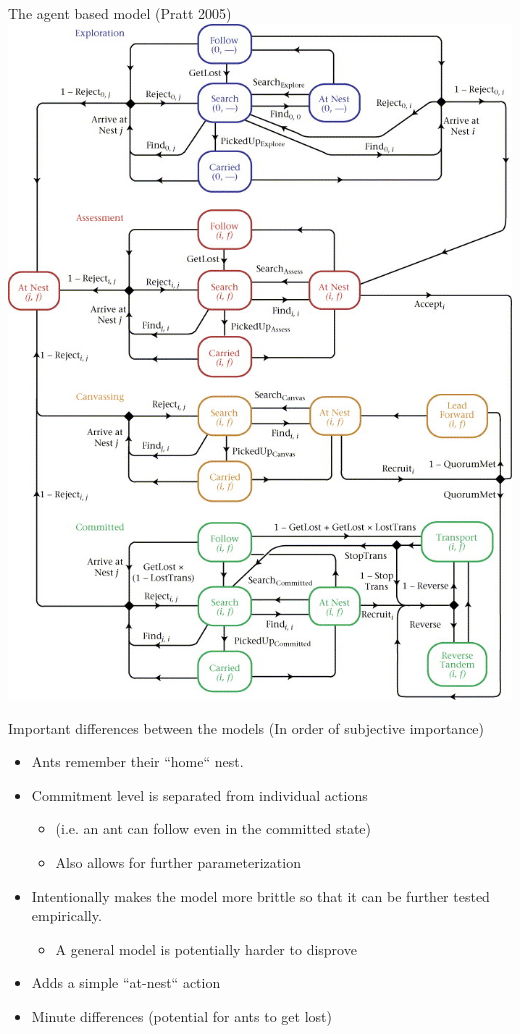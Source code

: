 \documentclass{beamer}
\newcommand{\sitem}[1]
{
    \begin{itemize}
        \item #1
    \end{itemize}
}
\begin{document}
  \begin{frame}{The agent based model (Pratt 2005)}
       \includegraphics[scale=1.6]{agent}
  \end{frame}

  \begin{frame}{Important differences between the models (In order of subjective importance)}
      \begin{itemize}
          \item Ants remember their ``home`` nest.
          \item Commitment level is separated from individual actions 
              \sitem{(i.e. an ant can follow even in the committed state)}
              \sitem{Also allows for further parameterization}
          \item Intentionally makes the model more brittle so that it can be further tested empirically. 
              \sitem{A general model is potentially harder to disprove}
          \item Adds a simple ``at-nest`` action 
          \item Minute differences (potential for ants to get lost)
      \end{itemize}
  \end{frame}
\end{document}
